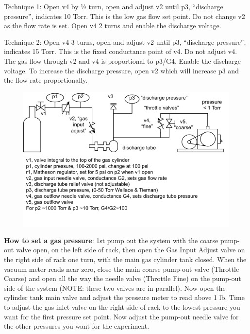 \documentclass{../lab}
\begin{document}
Technique 1: Open v4 by ½ turn, open and adjust v2 until p3, ``discharge pressure'', indicates 10 Torr. This is the low gas flow set point. Do not change v2 as the flow rate is set. Open v4 2 turns and enable the discharge voltage.

Technique 2: Open v4 3 turns, open and adjust v2 until p3, ``discharge pressure'', indicates 15 Torr. This is the fixed conductance point of v4. Do not adjust v4. The gas flow through v2 and v4 is proportional to p3/G4. Enable the discharge voltage. To increase the discharge pressure, open v2 which will increase p3 and the flow rate proportionally.

\begin{figure}[h]
    \centering
    \href{http://experimentationlab.berkeley.edu/sites/default/files/images/680px-Hall_diagram.png}{\includegraphics[width=\linewidth]{images/680px-Hall_diagram.png}}
    \label{fig:680px-Hall_diagram}
\end{figure}

\textbf{How to set a gas pressure}: 1st pump out the system with the coarse pump-out valve open, on the left side of rack, then open the Gas Input Adjust valve on the right side of rack one turn, with the main gas cylinder tank closed. When the vacuum meter reads near zero, close the main coarse pump-out valve (Throttle Coarse) and open all the way the needle valve (Throttle Fine) on the pump-out side of the system (NOTE: these two valves are in parallel). Now open the cylinder tank main valve and adjust the pressure meter to read above 1 lb. Time to adjust the gas inlet valve on the right side of rack to the lowest pressure you want for the first pressure set point. Now adjust the pump-out needle valve for the other pressures you want for the experiment.
\end{document}

